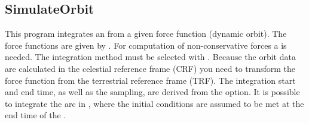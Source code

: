 \clearpage
\subsection{SimulateOrbit}\label{SimulateOrbit}
This program integrates an  from a given force function (dynamic orbit).
The force functions are given by .
For computation of non-conservative forces a  is needed.
The integration method must be selected with .
Because the orbit data are calculated in the celestial reference frame (CRF) you need
 to transform the force function
from the terrestrial reference frame (TRF).
The integration start and end time, as well as the sampling, are derived from
the  option. It is possible to integrate the arc in ,
where the initial conditions are assumed to be met at the end time of the .



